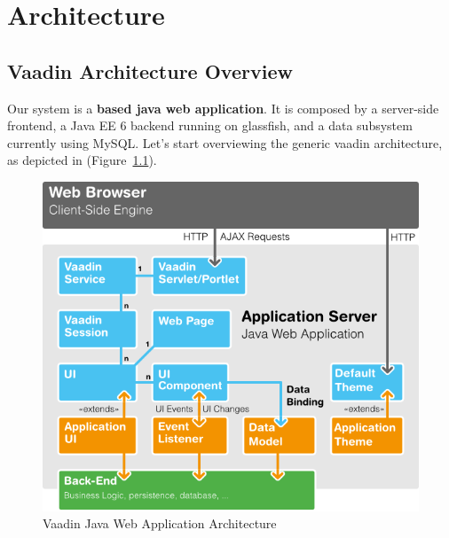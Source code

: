 
\chapter{Architecture}

\section{Vaadin Architecture Overview}
\label{sec:vaadin-architecture}


Our system is a \textbf{\vaadin based java web application}. It is
composed by a server-side frontend, a Java EE 6 backend running on
glassfish, and a data subsystem currently using MySQL.
%
Let's start overviewing the generic vaadin architecture, as depicted
in (Figure~\ref{fig:vaadin-architecture}).
%
\begin{figure}[htpb]
  \centering
  \includegraphics[scale=0.5]{figures/application-architecture-lo.png}
  \caption{Vaadin Java Web Application Architecture}
  \label{fig:vaadin-architecture}
\end{figure}
%
